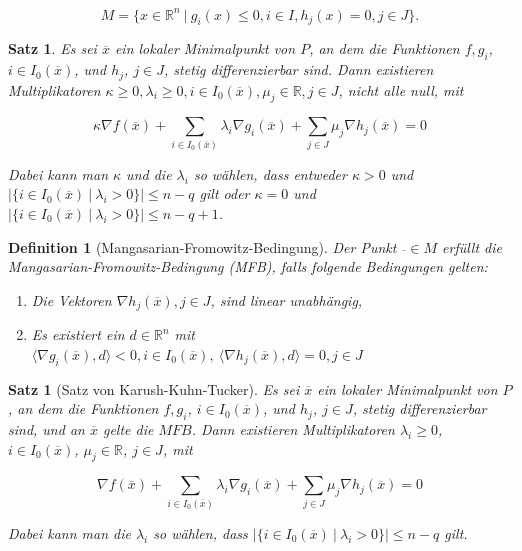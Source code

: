 \documentclass[11pt]{scrreprt}
\newcounter{thm}
\theoremstyle{thmstyle}
\numberwithin{thm}{section}
\newtheorem{definition}[thm]{Definition}
\newtheorem{satz}[thm]{Satz}
\begin{document}
$$ M = \big\{ x \in \mathbb{R}^n ~|~ g_i(x) \leq 0, i \in I, h_j(x) = 0, j \in J \big\}. $$
 
\begin{satz}
	Es sei $\overline{x}$ ein lokaler Minimalpunkt von $P$, an dem die Funktionen $f, g_i$, $i \in I_0(\overline{x})$, und $h_j$, $j \in J$, stetig differenzierbar sind. Dann existieren Multiplikatoren $\kappa \geq 0, \lambda_i \geq 0, i \in I_0(\overline{x}), \mu_j \in \mathbb{R}, j \in J$, nicht alle null, mit

		$$ \kappa \nabla f(\overline{x}) + \sum_{i \in I_0(\overline{x})} \lambda_i \nabla g_i(\overline{x}) + \sum_{j \in J} \mu_j \nabla h_j(\overline{x}) = 0 $$

	Dabei kann man $\kappa$ und die $\lambda_i$ so wählen, dass entweder $\kappa > 0$ und $|\{ i \in I_0(\overline{x}) ~|~ \lambda_i > 0 \}| \leq n - q$ gilt oder $\kappa = 0$ und $|\{ i \in I_0(\overline{x}) ~|~ \lambda_i > 0 \}| \leq n - q + 1$.
\end{satz} 

\begin{definition}[Mangasarian-Fromowitz-Bedingung]
	Der Punkt $\overline{} \in M$ erfüllt die Mangasarian-Fromowitz-Bedingung (MFB), falls folgende Bedingungen gelten:
	\begin{enumerate}[label=\alph*\upshape)]
		\item Die Vektoren $\nabla h_j(\overline{x}), j \in J$, sind linear unabhängig,
		\item Es existiert ein $d \in \mathbb{R}^n$ mit $\langle \nabla g_i(\overline{x}), d \rangle < 0, i \in I_0(\overline{x}), ~\langle \nabla h_j(\overline{x}), d \rangle = 0, j \in J$
	\end{enumerate}
\end{definition}
 
\begin{satz}[Satz von Karush-Kuhn-Tucker]
	Es sei $\overline{x}$ ein lokaler Minimalpunkt von $P$, an dem die Funktionen $f, g_i$, $i \in I_0(\overline{x})$, und $h_j$, $j \in J$, stetig differenzierbar sind, und an $\overline{x}$ gelte die $MFB$. Dann existieren Multiplikatoren $\lambda_i \geq 0$, $i \in I_0(\overline{x})$, $\mu_j \in \mathbb{R}$, $j \in J$, mit
	
		$$ \nabla f(\overline{x}) + \sum_{i \in I_0(\overline{x})} \lambda_i \nabla g_i(\overline{x}) + \sum_{j \in J} \mu_j \nabla h_j(\overline{x}) = 0 $$

	Dabei kann man die $\lambda_i$ so wählen, dass $|\{ i \in I_0(\overline{x}) ~|~ \lambda_i > 0 \}| \leq n - q$ gilt.	
\end{satz}
\end{document}
